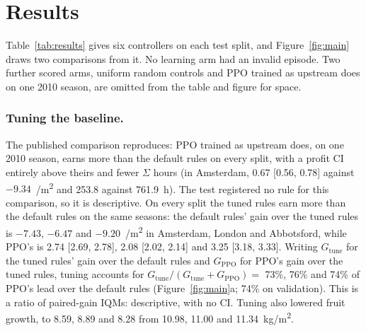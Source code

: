 \documentclass[letterpaper]{article} %
\newcommand{\eurm}{\texteuro/m\textsuperscript{2}}
\newcommand{\kgm}{kg/m\textsuperscript{2}}
\begin{document}
\section{Results}

Table~\ref{tab:results} gives six controllers on each test split, and Figure~\ref{fig:main} draws two comparisons from it. No learning arm had an invalid episode. Two further scored arms, uniform random controls and PPO trained as upstream does on one 2010 season, are omitted from the table and figure for space.

\subsubsection{Tuning the baseline.}
The published comparison reproduces: PPO trained as upstream does, on one 2010 season, earns more than the default rules on every split, with a profit CI entirely above theirs and fewer $\Sigma$ hours (in Amsterdam, 0.67 [0.56, 0.78] against $-9.34$~\eurm{} and 253.8 against 761.9~h). The test registered no rule for this comparison, so it is descriptive.
On every split the tuned rules earn more than the default rules on the same seasons: the default rules' gain over the tuned rules is $-7.43$, $-6.47$ and $-9.20$~\eurm{} in Amsterdam, London and Abbotsford, while PPO's is 2.74 [2.69, 2.78], 2.08 [2.02, 2.14] and 3.25 [3.18, 3.33].
Writing $G_{\mathrm{tune}}$ for the tuned rules' gain over the default rules and $G_{\mathrm{PPO}}$ for PPO's gain over the tuned rules, tuning accounts for $G_{\mathrm{tune}}/(G_{\mathrm{tune}} + G_{\mathrm{PPO}}) =$ 73\%, 76\% and 74\% of PPO's lead over the default rules (Figure~\ref{fig:main}a; 74\% on validation). This is a ratio of paired-gain IQMs: descriptive, with no CI.
Tuning also lowered fruit growth, to 8.59, 8.89 and 8.28 from 10.98, 11.00 and 11.34~\kgm{}.
\end{document}
